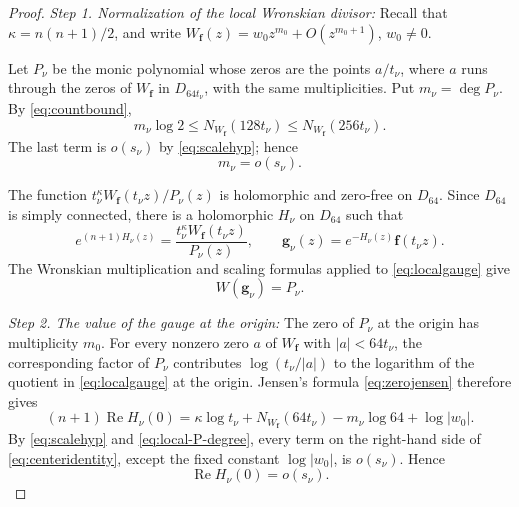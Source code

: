 \documentclass[12pt,letterpaper,reqno]{amsart}
\theoremstyle{definition}
\numberwithin{equation}{section}
\newcommand{\NN}{N}
\DeclareMathOperator{\Ree}{Re}
\newcommand{\fv}{\bm f}
\newcommand{\gv}{\bm g}
\begin{document}
\begin{proof}

\medskip\noindent
\emph{{Step 1. Normalization of the local Wronskian divisor:}}
Recall that
\(\kappa=n(n+1)/2\), and write
\(W_{\fv}(z)=w_0z^{m_0}+O(z^{m_0+1})\), \(w_0\ne0\).

Let \(P_\nu\) be the monic polynomial whose zeros are the points
\(a/t_\nu\), where \(a\) runs through the zeros of \(W_{\fv}\) in
\(D_{64t_\nu}\), with the same multiplicities. Put
\(m_\nu=\deg P_\nu\). By \eqref{eq:countbound},
\[
 m_\nu\log2
 \leq
 \NN_{W_{\fv}}(128t_\nu)
 \leq
 \NN_{W_{\fv}}(256t_\nu).
\]
The last term is \(o(s_\nu)\) by \eqref{eq:scalehyp}; hence
\begin{equation}\label{eq:local-P-degree}
 m_\nu=o(s_\nu).
\end{equation}

The function
\(t_\nu^\kappa W_{\fv}(t_\nu z)/P_\nu(z)\)
is holomorphic and zero-free on \(D_{64}\). Since \(D_{64}\) is simply
connected, there is a holomorphic \(H_\nu\) on \(D_{64}\) such that
\begin{equation}\label{eq:localgauge}
 e^{(n+1)H_\nu(z)}
 =
 \frac{t_\nu^\kappa W_{\fv}(t_\nu z)}{P_\nu(z)},
 \qquad
 \gv_\nu(z)
 =
 e^{-H_\nu(z)}\fv(t_\nu z).
\end{equation}
The Wronskian multiplication and scaling formulas applied to
\eqref{eq:localgauge} give
\begin{equation}\label{eq:local-wronskian-normalization}
 W(\gv_\nu)=P_\nu.
\end{equation}


\medskip\noindent
\emph{{Step 2. The value of the gauge at the origin:}}
The zero of \(P_\nu\) at the origin has multiplicity \(m_0\). For every
nonzero zero \(a\) of \(W_{\fv}\) with \(|a|<64t_\nu\), the
corresponding factor of \(P_\nu\) contributes
\(\log(t_\nu/|a|)\) to the logarithm of the quotient in
\eqref{eq:localgauge} at the origin. Jensen's formula
\eqref{eq:zerojensen} therefore gives
\begin{equation}\label{eq:centeridentity}
 (n+1)\Ree H_\nu(0)
 =
 \kappa\log t_\nu
 +
 \NN_{W_{\fv}}(64t_\nu)
 -
 m_\nu\log64
 +
 \log|w_0|.
\end{equation}
By \eqref{eq:scalehyp} and \eqref{eq:local-P-degree}, every term on
the right-hand side of \eqref{eq:centeridentity}, except the fixed
constant \(\log|w_0|\), is \(o(s_\nu)\). Hence
\begin{equation}\label{eq:H-center-small}
 \Ree H_\nu(0)=o(s_\nu).
\end{equation}


\end{proof}
\end{document}
